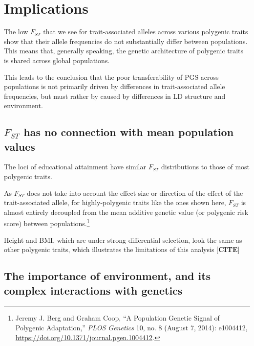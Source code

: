\documentclass[
]{book}
\begin{document}
\hypertarget{implications}{%
\section{Implications}\label{implications}}

The low \(F_{ST}\) that we see for trait-associated alleles across various polygenic traits show that their allele frequencies do not substantially differ between populations. This means that, generally speaking, the genetic architecture of polygenic traits is shared across global populations.

This leads to the conclusion that the poor transferability of PGS across populations is not primarily driven by differences in trait-associated allele frequencies, but must rather by caused by differences in LD structure and environment.

\hypertarget{f_st-has-no-connection-with-mean-population-values}{%
\subsection{\texorpdfstring{\(F_{ST}\) has no connection with mean population values}{F\_\{ST\} has no connection with mean population values}}\label{f_st-has-no-connection-with-mean-population-values}}

The loci of educational attainment have similar \(F_{ST}\) distributions to those of most polygenic traits.

As \(F_{ST}\) does not take into account the effect size or direction of the effect of the trait-associated allele, for highly-polygenic traits like the ones shown here, \(F_{ST}\) is almost entirely decoupled from the mean additive genetic value (or polygenic risk score) between populations.\footnote{Jeremy J. Berg and Graham Coop, {``A {Population Genetic Signal} of {Polygenic Adaptation},''} \emph{PLOS Genetics} 10, no. 8 (August 7, 2014): e1004412, \url{https://doi.org/10.1371/journal.pgen.1004412}.}

Height and BMI, which are under strong differential selection, look the same as other polygenic traits, which illustrates the limitations of this analysis {[}\textbf{CITE}{]}

\hypertarget{the-importance-of-environment-and-its-complex-interactions-with-genetics}{%
\subsection{The importance of environment, and its complex interactions with genetics}\label{the-importance-of-environment-and-its-complex-interactions-with-genetics}}
\end{document}
